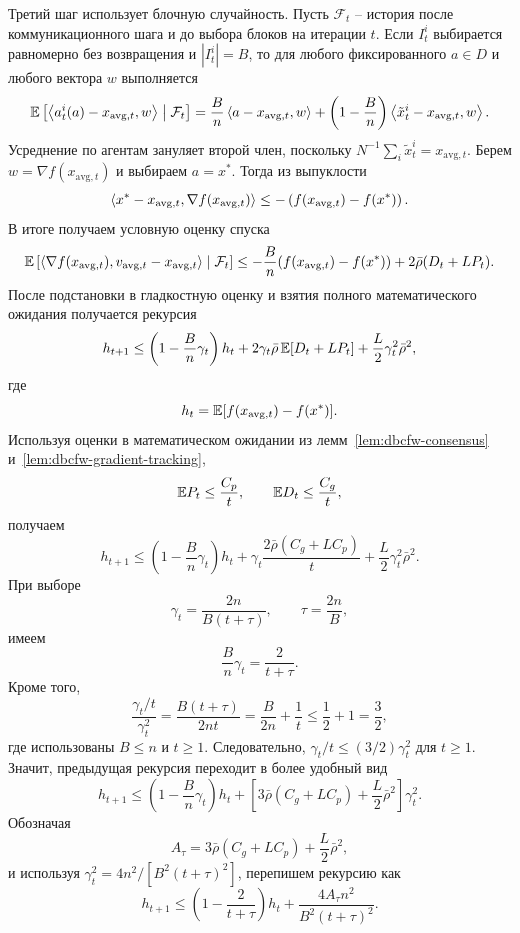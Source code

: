 Третий шаг использует блочную случайность.
Пусть $\mathcal F_t$ -- история после коммуникационного шага и до выбора блоков на
итерации $t$.
Если $I_t^i$ выбирается равномерно без возвращения и $|I_t^i|=B$, то для любого
фиксированного $a\in D$ и любого вектора $w$ выполняется
\[
    \mathbb{E}\left[
        \left\langle a_t^i(a)-x_{\mathrm{avg},t}, w \right\rangle
        \;\middle|\;\mathcal F_t
    \right]
    =
    \frac{B}{n}\left\langle a-x_{\mathrm{avg},t}, w \right\rangle
    +
    \left(1-\frac{B}{n}\right)
    \left\langle \tilde x_t^i-x_{\mathrm{avg},t}, w \right\rangle.
\]
Усреднение по агентам зануляет второй член, поскольку
$N^{-1}\sum_i\tilde x_t^i=x_{\mathrm{avg},t}$.
Берем $w=\nabla f(x_{\mathrm{avg},t})$ и выбираем $a=x^\ast$.
Тогда из выпуклости
\[
    \left\langle x^\ast-x_{\mathrm{avg},t}, \nabla f(x_{\mathrm{avg},t}) \right\rangle
    \leq
    -\left(f(x_{\mathrm{avg},t})-f(x^\ast)\right).
\]
В итоге получаем условную оценку спуска
\[
    \mathbb{E}\left[
    \left\langle \nabla f(x_{\mathrm{avg},t}), v_{\mathrm{avg},t}-x_{\mathrm{avg},t} \right\rangle
    \;\middle|\; \mathcal F_t\right]
    \leq
    -\frac{B}{n}
    (f(x_{\mathrm{avg},t})-f(x^\ast))
    +
    2\bar\rho(D_t+LP_t).
\]
После подстановки в гладкостную оценку и взятия полного математического ожидания
получается рекурсия
\[
    h_{t+1}
    \leq
    \left(1-\frac{B}{n}\gamma_t\right)h_t
    +
    2\gamma_t\bar\rho\,\mathbb{E}[D_t+LP_t]
    +
    \frac{L}{2}\gamma_t^2\bar\rho^2,
\]
где
\[
    h_t=\mathbb{E}[f(x_{\mathrm{avg},t})-f(x^\ast)].
\]
Используя оценки в математическом ожидании из лемм~\ref{lem:dbcfw-consensus}
и~\ref{lem:dbcfw-gradient-tracking},
\[
    \mathbb{E} P_t\leq\frac{C_p}{t},
    \qquad
    \mathbb{E} D_t\leq\frac{C_g}{t},
\]
получаем
\[
    h_{t+1}
    \leq
    \left(1-\frac{B}{n}\gamma_t\right)h_t
    +
    \gamma_t
    \frac{2\bar\rho(C_g+LC_p)}{t}
    +
    \frac{L}{2}\gamma_t^2\bar\rho^2.
\]
При выборе
\[
    \gamma_t=\frac{2n}{B(t+\tau)},
    \qquad
    \tau=\frac{2n}{B},
\]
имеем
\[
    \frac{B}{n}\gamma_t=\frac{2}{t+\tau}.
\]
Кроме того,
\[
    \frac{\gamma_t/t}{\gamma_t^2}
    =
    \frac{B(t+\tau)}{2nt}
    =
    \frac{B}{2n}+\frac{1}{t}
    \leq
    \frac12+1
    =
    \frac32,
\]
где использованы $B\leq n$ и $t\geq1$.
Следовательно, $\gamma_t/t\leq(3/2)\gamma_t^2$ для $t\geq1$.
Значит, предыдущая рекурсия переходит в более удобный вид
\[
    h_{t+1}
    \leq
    \left(1-\frac{B}{n}\gamma_t\right)h_t
    +
    \left[
        3\bar\rho(C_g+LC_p)+\frac{L}{2}\bar\rho^2
    \right]\gamma_t^2.
\]
Обозначая
\[
    A_\tau=
    3\bar\rho(C_g+LC_p)+\frac{L}{2}\bar\rho^2,
\]
и используя $\gamma_t^2=4n^2/[B^2(t+\tau)^2]$, перепишем рекурсию как
\[
    h_{t+1}
    \leq
    \left(1-\frac{2}{t+\tau}\right)h_t
    +
    \frac{4A_\tau n^2}{B^2(t+\tau)^2}.
\]
